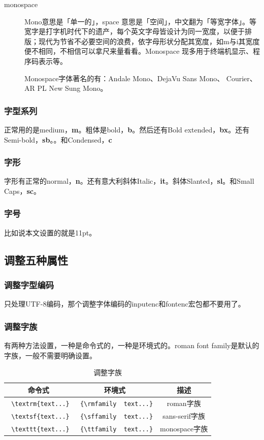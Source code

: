 \documentclass[11pt,oneside]{book}
\begin{document}
\begin{common-format}
\begin{description}
\item[monospace] Mono意思是「单一的」，space 意思是「空间」，中文翻为「等宽字体」。等宽字是打字机时代下的遗产，每个英文字母皆设计为同一宽度，以便于排版；现代为节省不必要空间的浪费，依字母形状分配其宽度，如m与i其宽度便不相同，不相信可以拿尺来量看看。Monospace 现多用于终端机显示、程序码表示等。

Monospace字体著名的有：Andale Mono、DejaVu Sans Mono\linebreak 、 Courier、AR PL New Sung Mono。
\end{description}


\subsubsection{字型系列}
正常用的是medium，\textbf{m}。粗体是bold，\textbf{b}。然后还有Bold extended，\textbf{bx}。还有Semi-bold，\textbf{sb}。。和Condensed，\textbf{c}


\subsubsection{字形}
字形有正常的normal，\textbf{n}。还有意大利斜体Italic，\textbf{it}。斜体Slanted，\textbf{sl}。和Small Caps，\textbf{sc}。


\subsubsection{字号}
比如说本文设置的就是11pt。

\subsection{调整五种属性}
\subsubsection{调整字型编码}
\XeLaTeX 只处理UTF-8编码，那个调整字体编码的inputenc和fontenc宏包都不要用了。


\subsubsection{调整字族}
有两种方法设置，一种是命令式的，一种是环境式的。roman font family是默认的字族，一般不需要明确设置。
\begin{table}[H]
\label{tab:调整字族}
\begin{tabular}{|c|c|c|}
\hline
命令式 & 环境式 & 描述 \\
\hline
\verb+ \textrm{text...}+ & \verb+ {\rmfamily  text...}+  & roman字族 \\[5pt]  
\verb+ \textsf{text...}+ & \verb+ {\sffamily  text...}+  & sans-serif字族 \\[5pt]
\verb+ \texttt{text...}+ & \verb+ {\ttfamily  text...}+  & monospace字族 \\
\hline
\end{tabular}
\caption{调整字族}
\end{table}


\end{common-format}
\end{document}
